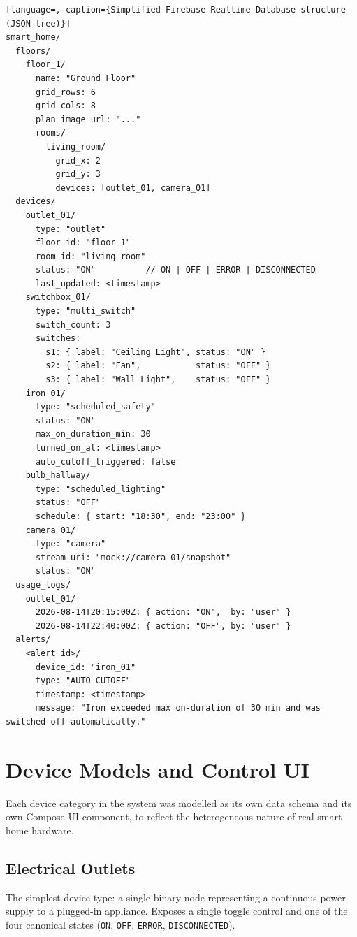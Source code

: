 \documentclass[11pt,a4paper]{article}
\begin{document}
\begin{lstlisting}[language=, caption={Simplified Firebase Realtime Database structure (JSON tree)}]
smart_home/
  floors/
    floor_1/
      name: "Ground Floor"
      grid_rows: 6
      grid_cols: 8
      plan_image_url: "..."
      rooms/
        living_room/
          grid_x: 2
          grid_y: 3
          devices: [outlet_01, camera_01]
  devices/
    outlet_01/
      type: "outlet"
      floor_id: "floor_1"
      room_id: "living_room"
      status: "ON"          // ON | OFF | ERROR | DISCONNECTED
      last_updated: <timestamp>
    switchbox_01/
      type: "multi_switch"
      switch_count: 3
      switches:
        s1: { label: "Ceiling Light", status: "ON" }
        s2: { label: "Fan",           status: "OFF" }
        s3: { label: "Wall Light",    status: "OFF" }
    iron_01/
      type: "scheduled_safety"
      status: "ON"
      max_on_duration_min: 30
      turned_on_at: <timestamp>
      auto_cutoff_triggered: false
    bulb_hallway/
      type: "scheduled_lighting"
      status: "OFF"
      schedule: { start: "18:30", end: "23:00" }
    camera_01/
      type: "camera"
      stream_uri: "mock://camera_01/snapshot"
      status: "ON"
  usage_logs/
    outlet_01/
      2026-08-14T20:15:00Z: { action: "ON",  by: "user" }
      2026-08-14T22:40:00Z: { action: "OFF", by: "user" }
  alerts/
    <alert_id>/
      device_id: "iron_01"
      type: "AUTO_CUTOFF"
      timestamp: <timestamp>
      message: "Iron exceeded max on-duration of 30 min and was switched off automatically."
\end{lstlisting}

\newpage

\section{Device Models and Control UI}

Each device category in the system was modelled as its own data schema and its own Compose UI component, to reflect the heterogeneous nature of real smart-home hardware.

\subsection{Electrical Outlets}
The simplest device type: a single binary node representing a continuous power supply to a plugged-in appliance. Exposes a single toggle control and one of the four canonical states (\texttt{ON}, \texttt{OFF}, \texttt{ERROR}, \texttt{DISCONNECTED}).
\end{document}
